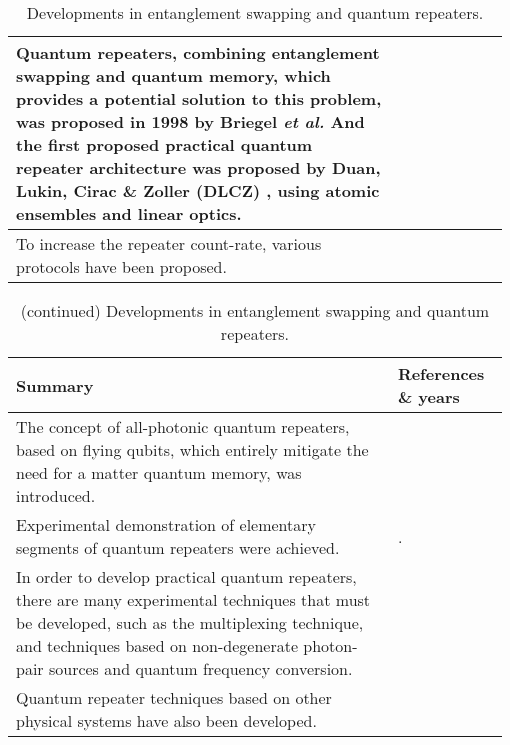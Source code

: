 \begin{table*}[!htbp]
\begin{tabular}{|p{0.755\linewidth}|p{0.22\linewidth}|}
		Quantum repeaters, combining entanglement swapping and quantum memory, which provides a potential solution to this problem, was proposed in 1998 by Briegel \textit{et al.} And the first proposed practical quantum repeater architecture was proposed by Duan, Lukin, Cirac \& Zoller (DLCZ) , using atomic ensembles and linear optics.&\cite{bib:BDCZ98, bib:Duan01}\\\hline
		To increase the repeater count-rate, various protocols  have been proposed.&\cite{bib:RMP_83_33, bib:PRA_79_042340, bib:PRA_92_012307, bib:PRA_81_052311, bib:PRA_81_052329, bib:NP_6_777, bib:MKLLJ14}\\\hline
	\end{tabular}
		\captionspacetab \caption{Developments in entanglement swapping and quantum repeaters.} \label{tab:entanglement_swap1}
\end{table*}

\begin{table*}[!htbp]
	\begin{tabular}{|p{0.755\linewidth}|p{0.22\linewidth}|}
		\hline
		Summary & References \& years \\
		\hline \hline
		The concept of all-photonic quantum repeaters, based on flying qubits, which entirely mitigate the need for a matter quantum memory, was introduced. &\cite{bib:azuma2015all}\\\hline
		Experimental demonstration of elementary segments of quantum repeaters were achieved.&\cite{bib:Sc_316_1316, bib:Nature_454_1098}.\\\hline
		In order to develop practical quantum repeaters, there are many experimental techniques that must be developed, such as the multiplexing technique, and techniques based on non-degenerate photon-pair sources and quantum frequency conversion. &\cite{bib:PRA_76_050301, bib:PRA_82_010304, bib:PRL_113_053603, bib:PRL_98_060502,bib:Nat_469_508, bib:Nat_469_512, bib:PRL_112_040504, bib:PRA_92_012329,bib:NP_6_894, bib:NC_5_3376}\\\hline
		Quantum repeater techniques based on other physical systems have also been developed. &\cite{bib:NP_11_37, bib:Sc_337_72, bib:N_484_195, bib:bernien2013heralded}\\\hline
	\end{tabular}
		\captionspacetab \caption{(continued) Developments in entanglement swapping and quantum repeaters.} \label{tab:entanglement_swap2}
\end{table*}

